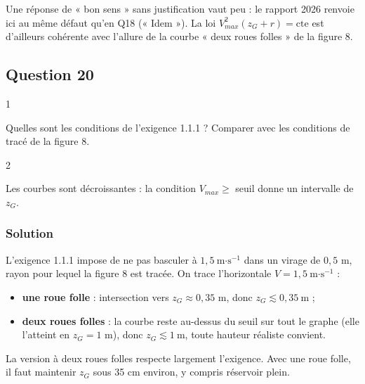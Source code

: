\documentclass[11pt,a4paper]{article}
\providecommand{\tightlist}{\setlength{\itemsep}{0pt}\setlength{\parskip}{0pt}}
\renewcommand{\geq}{\geqslant}
\begin{document}
\begin{piege}

Une réponse de « bon sens » sans justification vaut peu : le rapport 2026 renvoie ici au même défaut qu'en Q18 (« Idem »). La loi \(V_{max}^2(z_G + r) = \text{cte}\) est d'ailleurs cohérente avec l'allure de la courbe « deux roues folles » de la figure 8.

\end{piege}

\hypertarget{question-20}{%
\subsection{Question 20}\label{question-20}}

\begin{indication}{1}

Quelles sont les conditions de l'exigence 1.1.1 ? Comparer avec les conditions de tracé de la figure 8.

\end{indication}

\begin{indication}{2}

Les courbes sont décroissantes : la condition \(V_{max} \geq\) seuil donne un intervalle de \(z_G\).

\end{indication}

\hypertarget{solution-19}{%
\subsubsection{Solution}\label{solution-19}}

L'exigence 1.1.1 impose de ne pas basculer à \(1{,}5\ \text{m·s}^{-1}\) dans un virage de \(0{,}5\) m, rayon pour lequel la figure 8 est tracée. On trace l'horizontale \(V = 1{,}5\ \text{m·s}^{-1}\) :

\begin{itemize}
\tightlist
\item
  \textbf{une roue folle} : intersection vers \(z_G \approx 0{,}35\) m, donc \(\boxed{z_G \lesssim 0{,}35\ \text{m}}\) ;
\item
  \textbf{deux roues folles} : la courbe reste au-dessus du seuil sur tout le graphe (elle l'atteint en \(z_G = 1\) m), donc \(\boxed{z_G \lesssim 1\ \text{m}}\), toute hauteur réaliste convient.
\end{itemize}

La version à deux roues folles respecte largement l'exigence. Avec une roue folle, il faut maintenir \(z_G\) sous 35 cm environ, y compris réservoir plein.
\end{document}
